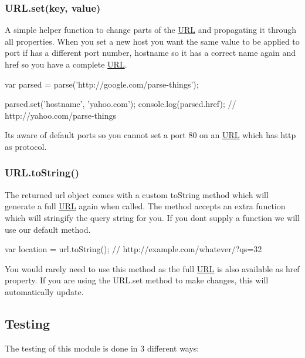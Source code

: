 \subsubsection*{U\+R\+L.\+set(key, value)}

A simple helper function to change parts of the \mbox{\hyperlink{namespace_u_r_l}{U\+RL}} and propagating it through all properties. When you set a new {\ttfamily host} you want the same value to be applied to {\ttfamily port} if has a different port number, {\ttfamily hostname} so it has a correct name again and {\ttfamily href} so you have a complete \mbox{\hyperlink{namespace_u_r_l}{U\+RL}}.


\begin{DoxyCode}
var parsed = parse('http://google.com/parse-things');

parsed.set('hostname', 'yahoo.com');
console.log(parsed.href); // http://yahoo.com/parse-things
\end{DoxyCode}


It\textquotesingle{}s aware of default ports so you cannot set a port 80 on an \mbox{\hyperlink{namespace_u_r_l}{U\+RL}} which has {\ttfamily http} as protocol.

\subsubsection*{U\+R\+L.\+to\+String()}

The returned {\ttfamily url} object comes with a custom {\ttfamily to\+String} method which will generate a full \mbox{\hyperlink{namespace_u_r_l}{U\+RL}} again when called. The method accepts an extra function which will stringify the query string for you. If you don\textquotesingle{}t supply a function we will use our default method.


\begin{DoxyCode}
var location = url.toString(); // http://example.com/whatever/?qs=32
\end{DoxyCode}


You would rarely need to use this method as the full \mbox{\hyperlink{namespace_u_r_l}{U\+RL}} is also available as {\ttfamily href} property. If you are using the {\ttfamily U\+R\+L.\+set} method to make changes, this will automatically update.

\subsection*{Testing}

The testing of this module is done in 3 different ways\+:


